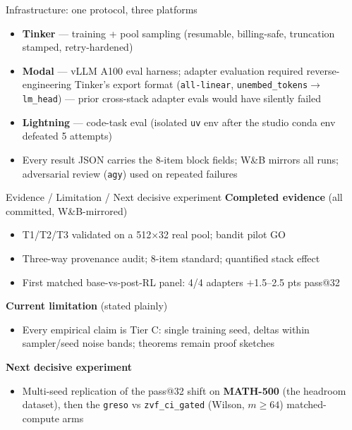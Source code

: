 \documentclass[aspectratio=169,11pt]{beamer}
\newcommand{\good}[1]{\textcolor{green!50!black}{#1}}
\newcommand{\warn}[1]{\textcolor{orange!80!black}{#1}}
\begin{document}
\begin{frame}{Infrastructure: one protocol, three platforms}
  \begin{itemize}
    \item \textbf{Tinker} — training + pool sampling (resumable, billing-safe,
          truncation stamped, retry-hardened)
    \item \textbf{Modal} — vLLM A100 eval harness; adapter evaluation required
          reverse-engineering Tinker's export format
          (\texttt{all-linear}, \texttt{unembed\_tokens}$\to$\texttt{lm\_head})
          --- prior cross-stack adapter evals would have silently failed
    \item \textbf{Lightning} — code-task eval (isolated \texttt{uv} env after
          the studio conda env defeated 5 attempts)
    \item Every result JSON carries the 8-item block fields; W\&B mirrors all
          runs; adversarial review (\texttt{agy}) used on repeated failures
  \end{itemize}
\end{frame}

\begin{frame}{Evidence / Limitation / Next decisive experiment}
  \textbf{Completed evidence} \good{(all committed, W\&B-mirrored)}
  \begin{itemize}
    \item T1/T2/T3 validated on a 512$\times$32 real pool; bandit pilot GO
    \item Three-way provenance audit; 8-item standard; quantified stack effect
    \item First matched base-vs-post-RL panel: 4/4 adapters $+$1.5--2.5 pts
          pass@32
  \end{itemize}
  \textbf{Current limitation} \warn{(stated plainly)}
  \begin{itemize}
    \item Every empirical claim is Tier C: single training seed, deltas within
          sampler/seed noise bands; theorems remain proof sketches
  \end{itemize}
  \textbf{Next decisive experiment}
  \begin{itemize}
    \item Multi-seed replication of the pass@32 shift on \textbf{MATH-500}
          (the headroom dataset), then the \texttt{greso} vs
          \texttt{zvf\_ci\_gated} (Wilson, $m{\ge}64$) matched-compute arms
  \end{itemize}
\end{frame}
\end{document}
